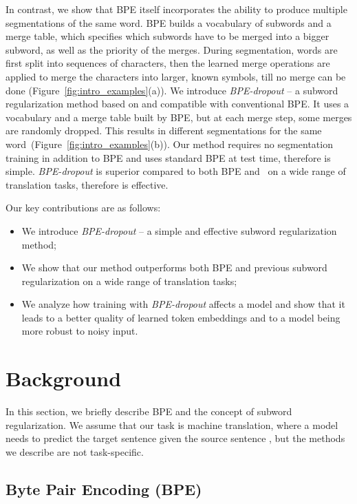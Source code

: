 \documentclass[11pt,a4paper]{article}
\begin{document}
In contrast, we show that BPE itself incorporates the ability to produce multiple segmentations of the same word. BPE builds a vocabulary of subwords and a merge table, which specifies which subwords have to be merged into a bigger subword, as well as the priority of the merges. During segmentation, words are first split into sequences of characters, then the learned merge operations are applied to merge the characters into larger, known symbols, till no merge can be done (Figure~\ref{fig:intro_examples}(a)). We introduce \textit{BPE-dropout} -- a subword regularization method based on and compatible with conventional BPE. It uses a vocabulary and a merge table built by BPE, but at each merge step, some merges are randomly dropped. This results in different segmentations for the same word~(Figure~\ref{fig:intro_examples}(b)). 
Our method requires no segmentation training in addition to BPE and uses standard BPE at test time, therefore is simple. \textit{BPE-dropout} is superior compared to both BPE and~\citet{sentencepiece} on a wide range of translation tasks, therefore is effective.

Our key contributions are as follows:
\begin{itemize}
    \item We introduce \textit{BPE-dropout} -- a simple and effective subword regularization method;
    \item We show that our method outperforms both BPE and previous subword regularization on a wide range of translation tasks;
    \item We analyze how training with \textit{BPE-dropout}  affects a model and show that it leads to a better quality of learned token embeddings and to a model being more robust to noisy input.
\end{itemize}


 
\section{Background}




In this section, we briefly describe BPE and the concept of subword regularization.
We assume that our task is machine translation, where a model needs to predict the target sentence  given the source sentence , but the methods we describe are not task-specific.


\subsection{Byte Pair Encoding (BPE)}\label{sec:bpe}
\end{document}
